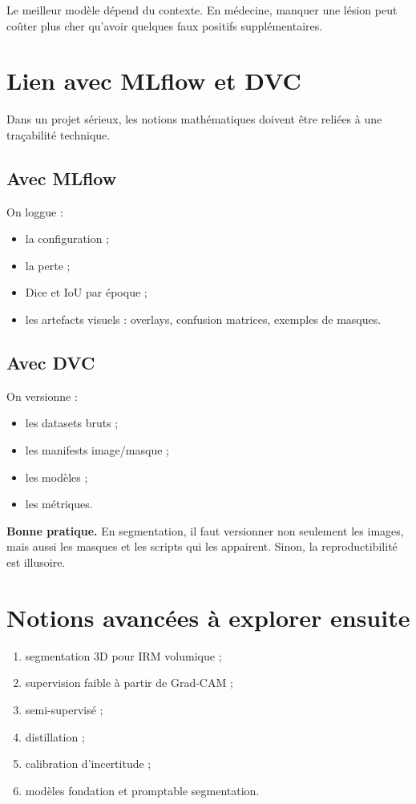 \documentclass[11pt]{article}
\begin{document}
Le meilleur modèle dépend du contexte. En médecine, manquer une lésion peut coûter plus cher qu'avoir quelques faux positifs supplémentaires.

\section{Lien avec MLflow et DVC}
Dans un projet sérieux, les notions mathématiques doivent être reliées à une traçabilité technique.

\subsection{Avec MLflow}
On loggue :
\begin{itemize}
  \item la configuration ;
  \item la perte ;
  \item Dice et IoU par époque ;
  \item les artefacts visuels : overlays, confusion matrices, exemples de masques.
\end{itemize}

\subsection{Avec DVC}
On versionne :
\begin{itemize}
  \item les datasets bruts ;
  \item les manifests image/masque ;
  \item les modèles ;
  \item les métriques.
\end{itemize}

\begin{warningBox}
\textbf{Bonne pratique.} En segmentation, il faut versionner non seulement les images, mais aussi les masques et les scripts qui les appairent. Sinon, la reproductibilité est illusoire.
\end{warningBox}

\section{Notions avancées à explorer ensuite}
\begin{enumerate}[label=\arabic*)]
  \item segmentation 3D pour IRM volumique ;
  \item supervision faible à partir de Grad-CAM ;
  \item semi-supervisé ;
  \item distillation ;
  \item calibration d'incertitude ;
  \item modèles fondation et promptable segmentation.
\end{enumerate}
\end{document}
